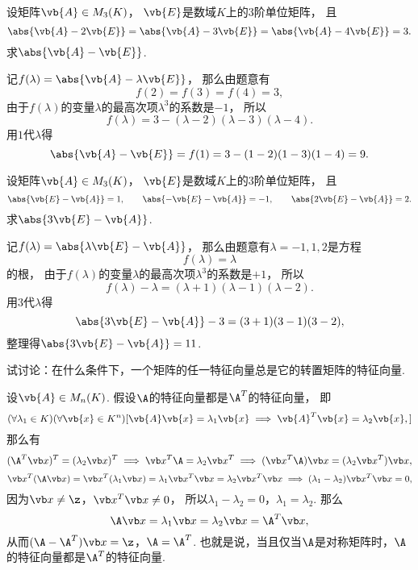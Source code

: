 \begin{example}
设矩阵\(\vb{A} \in M_3(K)\)，
\(\vb{E}\)是数域\(K\)上的3阶单位矩阵，
且\[
	\abs{\vb{A}-2\vb{E}}
	= \abs{\vb{A}-3\vb{E}}
	= \abs{\vb{A}-4\vb{E}}
	= 3.
\]
求\(\abs{\vb{A}-\vb{E}}\).
\begin{solution}
记\(f(\lambda) = \abs{\vb{A}-\lambda\vb{E}}\)，
那么由题意有\[
	f(2) = f(3) = f(4) = 3,
\]
由于\(f(\lambda)\)的变量\(\lambda\)的最高次项\(\lambda^3\)的系数是\(-1\)，
所以\[
	f(\lambda) = 3 - (\lambda-2)(\lambda-3)(\lambda-4).
\]
用\(1\)代\(\lambda\)得\[
	\abs{\vb{A}-\vb{E}}
	= f(1)
	= 3 - (1-2)(1-3)(1-4)
	= 9.
\]
\end{solution}
\end{example}
\begin{example}
设矩阵\(\vb{A} \in M_3(K)\)，
\(\vb{E}\)是数域\(K\)上的3阶单位矩阵，
且\[
	\abs{\vb{E}-\vb{A}} = 1,
	\qquad
	\abs{-\vb{E}-\vb{A}} = -1,
	\qquad
	\abs{2\vb{E}-\vb{A}} = 2.
\]
求\(\abs{3\vb{E}-\vb{A}}\).
\begin{solution}
记\(f(\lambda) = \abs{\lambda\vb{E}-\vb{A}}\)，
那么由题意有\(\lambda=-1,1,2\)是方程\[
	f(\lambda) = \lambda
\]的根，
由于\(f(\lambda)\)的变量\(\lambda\)的最高次项\(\lambda^3\)的系数是\(+1\)，
所以\[
	f(\lambda) - \lambda
	= (\lambda+1)(\lambda-1)(\lambda-2).
\]
用\(3\)代\(\lambda\)得\[
	\abs{3\vb{E}-\vb{A}} - 3
	= (3+1)(3-1)(3-2),
\]
整理得\(\abs{3\vb{E}-\vb{A}} = 11\).
\end{solution}
\end{example}

\begin{example}
试讨论：在什么条件下，一个矩阵的任一特征向量总是它的转置矩阵的特征向量.
\begin{solution}
设\(\vb{A} \in M_n(K)\).
假设\(\A\)的特征向量都是\(\A^T\)的特征向量，
即\[
	(\forall\lambda_1 \in K)
	(\forall\vb{x} \in K^n)
	[
		\vb{A} \vb{x} = \lambda_1 \vb{x}
		\implies
		\vb{A}^T \vb{x} = \lambda_2 \vb{x},
	]
\]
那么有\[
	(\A^T\x)^T=(\lambda_2\x)^T
	\implies
	\x^T\A=\lambda_2\x^T
	\implies
	(\x^T\A)\x=(\lambda_2\x^T)\x,
\]\[
	\x^T(\A\x)=\x^T(\lambda_1\x)=\lambda_1\x^T\x=\lambda_2\x^T\x
	\implies
	(\lambda_1-\lambda_2)\x^T\x=0,
\]
因为\(\x\neq\z\)，\(\x^T\x\neq0\)，
所以\(\lambda_1-\lambda_2=0\)，\(\lambda_1=\lambda_2\).
那么\[
	\A\x=\lambda_1\x=\lambda_2\x=\A^T\x,
\]
从而\((\A-\A^T)\x=\z\)，\(\A=\A^T\).
也就是说，当且仅当\(\A\)是对称矩阵时，\(\A\)的特征向量都是\(\A^T\)的特征向量.
\end{solution}
\end{example}

